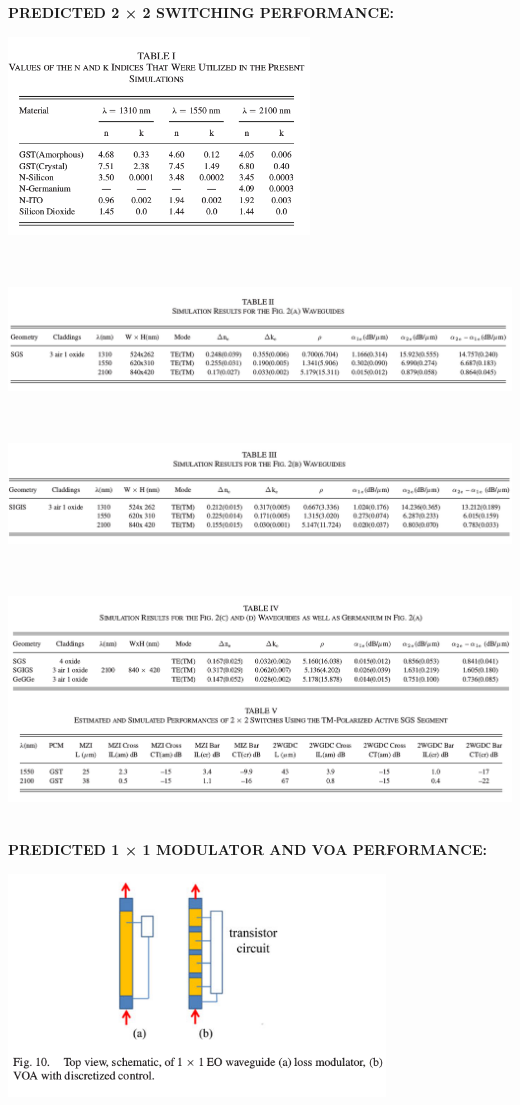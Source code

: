 \documentclass[]{article}
\begin{document}
\textbf{PREDICTED 2 × 2 SWITCHING PERFORMANCE:}\\
\centerline{\includegraphics[width=8cm]{image/004_04.png}}\\
\centerline{\includegraphics{image/004_05.png}}\\
\centerline{\includegraphics{image/004_06.png}}\\
\centerline{\includegraphics{image/004_07.png}}\\

\textbf{PREDICTED 1 × 1 MODULATOR AND VOA PERFORMANCE:}\\
\centerline{\includegraphics[width=10cm]{image/004_08.png}}
\end{document}
